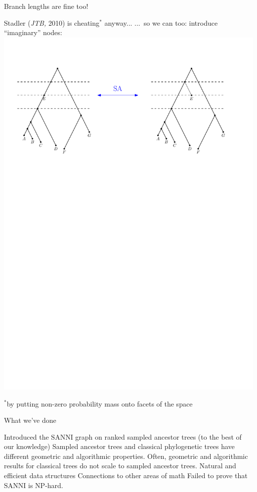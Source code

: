 \documentclass{beamer}
\begin{document}
\begin{frame}{Branch lengths are fine too!}
\begin{block}{Stadler (\emph{JTB,} 2010) is cheating${}^*$ anyway...}
...\ so we can too: introduce ``imaginary'' nodes:\\
\vskip10pt
\centering
\includegraphics[width=\framewidth]{SAT_dimension_solved}
\end{block}

\pause

\begin{block}{}
${}^*$by putting non-zero probability mass onto facets of the space
\end{block}
\end{frame}

\begin{frame}{What we've done}

\begin{block}{}
\begin{outline}
\1 Introduced the $\mathrm{SANNI}$ graph on ranked sampled ancestor trees (to the best of our knowledge)
\1 Sampled ancestor trees and classical phylogenetic trees have different geometric and algorithmic properties.
\1 Often, geometric and algorithmic results for classical trees do not scale to sampled ancestor trees.
\1 Natural and efficient data structures
\1 Connections to other areas of math
\pause
\1 Failed to prove that $\mathrm{SANNI}$ is $\mathrm{NP}$-hard.
\end{outline}
\end{block}
\end{frame}
\end{document}

